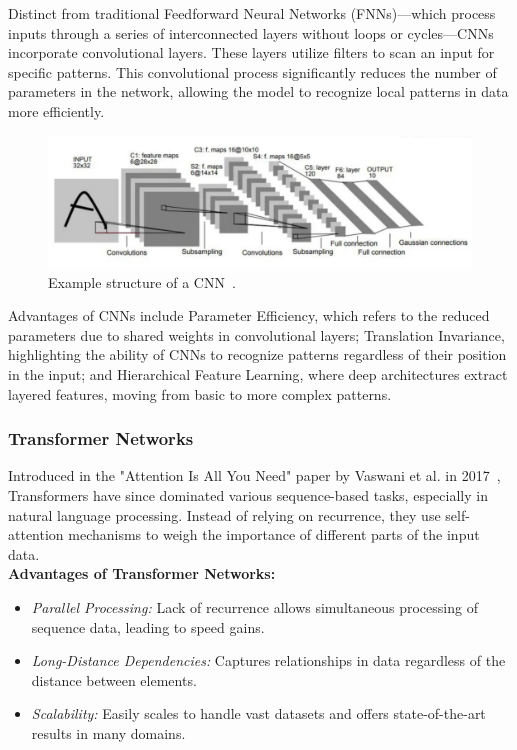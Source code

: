 Distinct from traditional Feedforward Neural Networks (FNNs)---which process inputs through a series of interconnected layers without loops or cycles---CNNs incorporate convolutional layers. These layers utilize filters to scan an input for specific patterns. This convolutional process significantly reduces the number of parameters in the network, allowing the model to recognize local patterns in data more efficiently.

\begin{figure}[htbp]
    \centering
    \includegraphics[scale=.5]{figures/lenet.png}
    \caption{Example structure of a CNN~\cite{lecun1995convolutional}. }
    \label{fig:lenet}
\end{figure}

Advantages of CNNs include Parameter Efficiency, which refers to the reduced parameters due to shared weights in convolutional layers; Translation Invariance, highlighting the ability of CNNs to recognize patterns regardless of their position in the input; and Hierarchical Feature Learning, where deep architectures extract layered features, moving from basic to more complex patterns.


\subsubsection*{Transformer Networks}
Introduced in the "Attention Is All You Need" paper by Vaswani et al. in 2017~\cite{vaswani2023attention}, Transformers have since dominated various sequence-based tasks, especially in natural language processing. Instead of relying on recurrence, they use self-attention mechanisms to weigh the importance of different parts of the input data.\\

\textbf{Advantages of Transformer Networks:}
\begin{itemize}
    \item \textit{Parallel Processing:} Lack of recurrence allows simultaneous processing of sequence data, leading to speed gains.
    \item \textit{Long-Distance Dependencies:} Captures relationships in data regardless of the distance between elements.
    \item \textit{Scalability:} Easily scales to handle vast datasets and offers state-of-the-art results in many domains.
\end{itemize}

